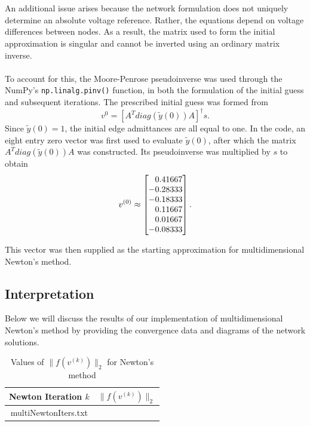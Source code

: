 \documentclass[12pt]{article}
\makeatletter
\def\expinput#1{\@@input#1 }
\makeatother
\begin{document}
\\\\
An additional issue arises because the network formulation does not uniquely determine an absolute voltage reference. Rather, the equations depend on voltage differences between nodes. As a result, the matrix used to form the initial approximation is singular and cannot be inverted using an ordinary matrix inverse. 
\\\\
To account for this, the Moore-Penrose pseudoinverse was used through the NumPy's \verb|np.linalg.pinv()| function, in both the formulation of the initial guess and subsequent iterations. 
The prescribed initial guess was formed from \begin{equation}
    v^{0} = [A^T diag(\tilde{y}(0))A]^\dagger s.
\end{equation}
Since $\tilde{y}(0) = 1$, the initial edge admittances are all equal to one. In the code, an eight entry zero vector was first used to evaluate $\tilde{y}(0)$, after which the matrix $A^T diag(\tilde{y}(0))A$ was constructed. Its pseudoinverse was multiplied by $s$ to obtain
\[
v^{(0)} \approx 
\begin{bmatrix}
\p 0.41667\\
-0.28333\\
-0.18333\\
\p 0.11667\\
\p 0.01667\\
-0.08333
\end{bmatrix}
.\]

This vector was then supplied as the starting approximation for multidimensional Newton's method.

\subsection{Interpretation} 
Below we will discuss the results of our implementation of multidimensional Newton's method by providing the convergence data and diagrams of the network solutions.

\begin{table}[H]
\centering
\begin{tabular}{c|c}
\toprule
Newton Iteration $k$ & $\|f(v^{(k)})\|_2$ \\
\midrule
\expinput{multiNewtonIters.txt}
\bottomrule
\end{tabular}
\caption{Values of $\|f(v^{(k)})\|_2$ for Newton's method}
\label{tab:1}
\end{table}
\end{document}
